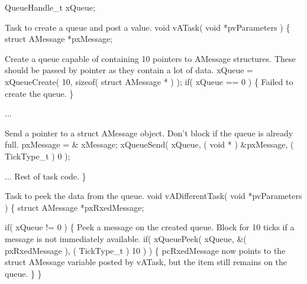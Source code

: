 \begin{DoxyPre} QueueHandle\_t xQueue;\end{DoxyPre}



\begin{DoxyPre}Task to create a queue and post a value.
 void vATask( void *pvParameters )
 \{
 struct AMessage *pxMessage;\end{DoxyPre}



\begin{DoxyPre}Create a queue capable of containing 10 pointers to AMessage structures.
These should be passed by pointer as they contain a lot of data.
    xQueue = xQueueCreate( 10, sizeof( struct AMessage * ) );
    if( xQueue == 0 )
    \{
Failed to create the queue.
    \}\end{DoxyPre}



\begin{DoxyPre}...\end{DoxyPre}



\begin{DoxyPre}Send a pointer to a struct AMessage object.  Don't block if the
queue is already full.
    pxMessage = \& xMessage;
    xQueueSend( xQueue, ( void * ) \&pxMessage, ( TickType\_t ) 0 );\end{DoxyPre}



\begin{DoxyPre}... Rest of task code.
 \}\end{DoxyPre}



\begin{DoxyPre}Task to peek the data from the queue.
 void vADifferentTask( void *pvParameters )
 \{
 struct AMessage *pxRxedMessage;\end{DoxyPre}



\begin{DoxyPre}    if( xQueue != 0 )
    \{
Peek a message on the created queue.  Block for 10 ticks if a
message is not immediately available.
        if( xQueuePeek( xQueue, \&( pxRxedMessage ), ( TickType\_t ) 10 ) )
        \{
pcRxedMessage now points to the struct AMessage variable posted
by vATask, but the item still remains on the queue.
        \}
    \}\end{DoxyPre}



